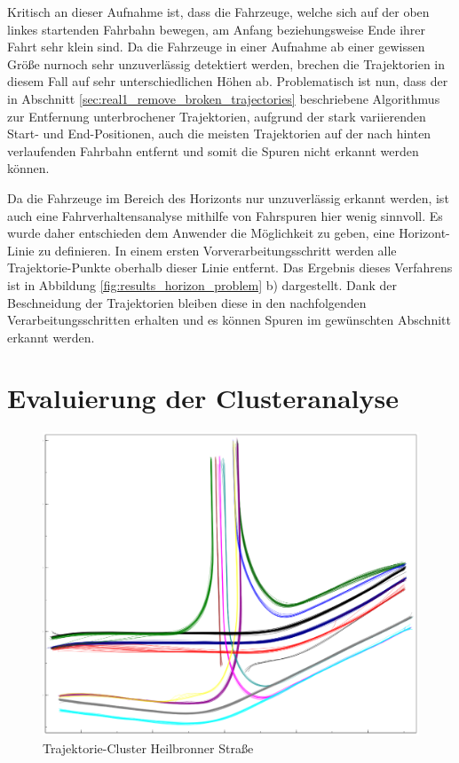 Kritisch an dieser Aufnahme ist, dass die Fahrzeuge, welche sich auf der oben linkes startenden Fahrbahn bewegen,
am Anfang beziehungsweise Ende ihrer Fahrt sehr klein sind. Da die Fahrzeuge in einer Aufnahme ab einer gewissen Größe
nurnoch sehr unzuverlässig detektiert werden, brechen die Trajektorien in diesem Fall auf sehr
unterschiedlichen Höhen ab.
Problematisch ist nun, dass der in Abschnitt \ref{sec:real1_remove_broken_trajectories} beschriebene Algorithmus
zur Entfernung unterbrochener Trajektorien, aufgrund der stark variierenden Start- und End-Positionen,
auch die meisten Trajektorien auf der nach hinten verlaufenden Fahrbahn entfernt und somit die Spuren nicht erkannt werden können.

Da die Fahrzeuge im Bereich des Horizonts nur unzuverlässig erkannt werden, ist auch eine Fahrverhaltensanalyse
mithilfe von Fahrspuren hier wenig sinnvoll. Es wurde daher entschieden dem Anwender die Möglichkeit zu geben, eine
Horizont-Linie zu definieren. In einem ersten Vorverarbeitungsschritt werden alle Trajektorie-Punkte oberhalb dieser
Linie entfernt. Das Ergebnis dieses Verfahrens ist in Abbildung \ref{fig:results_horizon_problem} b)
dargestellt. Dank der Beschneidung der Trajektorien bleiben diese in den nachfolgenden Verarbeitungsschritten
erhalten und es können Spuren im gewünschten Abschnitt erkannt werden.

\section{Evaluierung der Clusteranalyse}

\begin{figure}[H]
\centering
    \includegraphics[width=0.38\linewidth]{resources/img/results/Heilbronner/filteredClusters}
\caption{Trajektorie-Cluster Heilbronner Straße}
\label{fig:results_clusters_heilbronner}
\end{figure}

